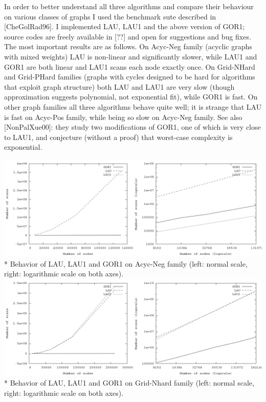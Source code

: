\documentclass{article}
\theoremstyle{definition}
\begin{document}
\begin{multicols}{2}
In order to better understand all three algorithms and compare their behaviour on various classes of graphs
I used the benchmark sute described in [CheGolRad96].
I implemented LAU, LAU1 and the above version of GOR1;
source codes are freely available in [??] and open for suggestions and bug fixes.
The most important results are as follows.
On Acyc-Neg family (acyclic graphs with mixed weights)
LAU is non-linear and significantly slower,
while LAU1 and GOR1 are both linear and LAU1 scans each node exactly once.
On Grid-NHard and Grid-PHard families (graphs with cycles designed to be hard for algorithms that exploit graph structure)
both LAU and LAU1 are very slow (though approximation suggests polynomial, not exponential fit),
while GOR1 is fast.
On other graph families all three algorithms behave quite well;
it is strange that LAU is fast on Acyc-Pos family, while being so slow on Acyc-Neg family.
See also [NonPalXue00]: they study two modifications of GOR1, one of which is very close to LAU1,
and conjecture (without a proof) that worst-case complexity is exponential.

\end{multicols}

\begin{center}
\includegraphics[width=\linewidth]{img/plot_acyc_neg_both.png}\\*
\footnotesize{Behavior of LAU, LAU1 and GOR1 on Acyc-Neg family (left: normal scale, right: logarithmic scale on both axes).}
\includegraphics[width=\linewidth]{img/plot_grid_nhard_both.png}\\*
\footnotesize{Behavior of LAU, LAU1 and GOR1 on Grid-Nhard family (left: normal scale, right: logarithmic scale on both axes).}
\end{center}
\end{document}
